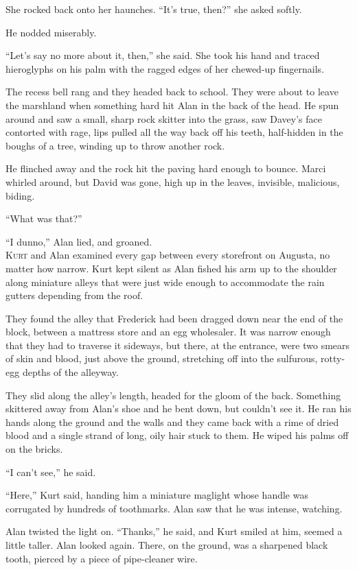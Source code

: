 She rocked back onto her haunches.  ``It's true, then?'' she asked
softly.

He nodded miserably.

``Let's say no more about it, then,'' she said.  She took his hand and
traced hieroglyphs on his palm with the ragged edges of her chewed-up
fingernails.

The recess bell rang and they headed back to school.  They were about
to leave the marshland when something hard hit Alan in the back of the
head.  He spun around and saw a small, sharp rock skitter into the
grass, saw Davey's face contorted with rage, lips pulled all the way
back off his teeth, half-hidden in the boughs of a tree, winding up to
throw another rock.

He flinched away and the rock hit the paving hard enough to bounce. 
Marci whirled around, but David was gone, high up in the leaves,
invisible, malicious, biding.

``What was that?''

``I dunno,'' Alan lied, and groaned.
\\
\lettrine[lines=3, lhang=.5, nindent=0pt, findent=2pt]{K}{urt} and Alan examined every gap between every storefront on Augusta,
no matter how narrow.  Kurt kept silent as Alan fished his arm up to
the shoulder along miniature alleys that were just wide enough to
accommodate the rain gutters depending from the roof.

They found the alley that Frederick had been dragged down near the end
of the block, between a mattress store and an egg wholesaler.  It was
narrow enough that they had to traverse it sideways, but there, at the
entrance, were two smears of skin and blood, just above the ground,
stretching off into the sulfurous, rotty-egg depths of the alleyway.

They slid along the alley's length, headed for the gloom of the back. 
Something skittered away from Alan's shoe and he bent down, but
couldn't see it.  He ran his hands along the ground and the walls and
they came back with a rime of dried blood and a single strand of long,
oily hair stuck to them.  He wiped his palms off on the bricks.

``I can't see,'' he said.

``Here,'' Kurt said, handing him a miniature maglight whose handle was
corrugated by hundreds of toothmarks.  Alan saw that he was intense,
watching.

Alan twisted the light on.  ``Thanks,'' he said, and Kurt smiled at
him, seemed a little taller.  Alan looked again.  There, on the
ground, was a sharpened black tooth, pierced by a piece of
pipe-cleaner wire.

